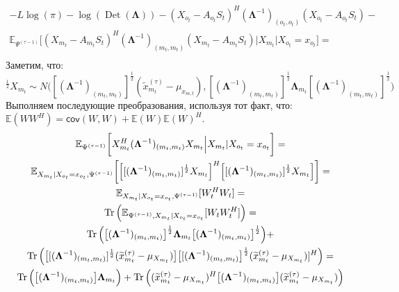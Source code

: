 \documentclass[11pt]{article}
\newcommand{\Expect}{\mathbb{E}}
\newcommand{\Cov}{\mathsf{cov}}
\DeclareMathOperator{\Det}{Det}
\begin{document}
\begin{equation*}
\begin{gathered}
-L \log(\pi) - \log (\Det(\mathbf{\Lambda}))  - (X_{o_t} - A_{o_t}S_t)^H (\mathbf{\Lambda}^{-1})_{(o_t, o_t)} (X_{o_t} - A_{o_t}S_t) - \\ \Expect_{\Psi^{(\tau-1)}} \bigg[ (X_{m_t} - A_{m_t}S_t)^H (\mathbf{\Lambda}^{-1})_{(m_t, m_t)} (X_{m_t} - A_{m_t}S_t) 
\Big|X_{m_t}|X_{o_t}=x_{o_t}\bigg] = \\
\end{gathered}
\end{equation*}
Заметим, что: 
\begin{equation*}
[(\mathbf{\Lambda}^{-1})_{(m_t, m_t)}]^{\frac{1}{2}}X_{m_t} \sim N\Big([(\mathbf{\Lambda}^{-1})_{(m_t, m_t)}]^{\frac{1}{2}}(\widetilde{x}_{m_t}^{(\tau)} - \mu_{x_{m,t}}),[(\mathbf{\Lambda}^{-1})_{(m_t, m_t)}]^{\frac{1}{2}}\mathbf{\Lambda}_{m_t}[(\mathbf{\Lambda}^{-1})_{(m_t, m_t)}]^{\frac{1}{2}}\Big)
\end{equation*}
Выполняем последующие преобразования, используя тот факт, что: $\Expect(WW^H)=\Cov(W,W)+\Expect(W)\Expect(W)^H$.
\begin{equation*}
\begin{gathered}
\Expect_{\Psi^{(\tau-1)}}\bigg[X_{m_t}^H (\mathbf{\Lambda}^{-1})_{(m_t, m_t)}X_{m_t}   \Big|X_{m_t}|X_{o_t}=x_{o_t}\bigg] = \\
\Expect_{X_{m_t}|X_{o_t}=x_{o_t}, \Psi^{(\tau-1)}}\bigg[\Big[[(\mathbf{\Lambda}^{-1})_{(m_t, m_t)}]^{\frac{1}{2}}X_{m_t}\Big]^H\Big[[(\mathbf{\Lambda}^{-1})_{(m_t, m_t)}]^{\frac{1}{2}}X_{m_t}\Big]\bigg] = \\
\Expect_{X_{m_t}|X_{o_t}=x_{o_t}, \Psi^{(\tau-1)}}[W_t^HW_t] = \\
\Tr \Big( \Expect_{\Psi^{(\tau-1)},X_{m_t}|X_{o_t}=x_{o_t}}[W_tW_t^H] \Big) = \\
\Tr \Big( \big[(\mathbf{\Lambda}^{-1})_{(m_t, m_t)}\big]^{\frac{1}{2}}\mathbf{\Lambda}_{m_t}\big[(\mathbf{\Lambda}^{-1})_{(m_t, m_t)}\big]^{\frac{1}{2}} \Big) + \\ \Tr \Big( \big[[(\mathbf{\Lambda}^{-1})_{(m_t, m_t)}]^{\frac{1}{2}}(\widetilde{x}_{m_t}^{(\tau)} - \mu_{X_{m_t}})\big]\big[[(\mathbf{\Lambda}^{-1})_{(m_t, m_t)}\big]^{\frac{1}{2}}(\widetilde{x}_{m_t}^{(\tau)} - \mu_{X_{m_t}})]^H \Big)= \\
\Tr \Big( \big[(\mathbf{\Lambda}^{-1})_{(m_t, m_t)}\big]\mathbf{\Lambda}_{m_t} \Big) + \Tr \Big((\widetilde{x}_{m_t}^{(\tau)} - \mu_{X_{m_t}})^H\big[(\mathbf{\Lambda}^{-1})_{(m_t, m_t)}\big](\widetilde{x}_{m_t}^{(\tau)} - \mu_{X_{m_t}}) \Big) \\
\end{gathered}
\end{equation*}
\end{document}
